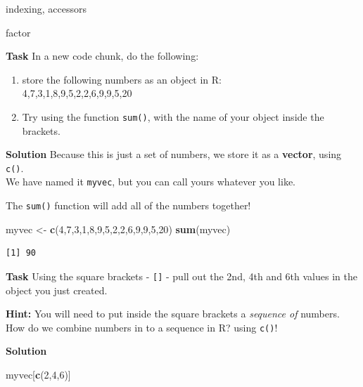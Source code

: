 \documentclass[]{book}
\newenvironment{Shaded}{\begin{snugshade}}{\end{snugshade}}
\newcommand{\DecValTok}[1]{\textcolor[rgb]{0.00,0.00,0.81}{#1}}
\newcommand{\KeywordTok}[1]{\textcolor[rgb]{0.13,0.29,0.53}{\textbf{#1}}}
\newcommand{\NormalTok}[1]{#1}
\newcommand{\StringTok}[1]{\textcolor[rgb]{0.31,0.60,0.02}{#1}}
\providecommand{\tightlist}{%
  \setlength{\itemsep}{0pt}\setlength{\parskip}{0pt}}
\begin{document}
indexing, accessors

factor

\textbf{Task}
In a new code chunk, do the following:

\begin{enumerate}
\def\labelenumi{\arabic{enumi}.}
\tightlist
\item
  store the following numbers as an object in R:\\
  4,7,3,1,8,9,5,2,2,6,9,9,5,20\\
\item
  Try using the function \texttt{sum()}, with the name of your object inside the brackets.
\end{enumerate}

\textbf{Solution }
Because this is just a set of numbers, we store it as a \textbf{vector}, using \texttt{c()}.\\
We have named it \texttt{myvec}, but you can call yours whatever you like.

The \texttt{sum()} function will add all of the numbers together!

\begin{Shaded}
\begin{Highlighting}[]
\NormalTok{myvec <-}\StringTok{ }\KeywordTok{c}\NormalTok{(}\DecValTok{4}\NormalTok{,}\DecValTok{7}\NormalTok{,}\DecValTok{3}\NormalTok{,}\DecValTok{1}\NormalTok{,}\DecValTok{8}\NormalTok{,}\DecValTok{9}\NormalTok{,}\DecValTok{5}\NormalTok{,}\DecValTok{2}\NormalTok{,}\DecValTok{2}\NormalTok{,}\DecValTok{6}\NormalTok{,}\DecValTok{9}\NormalTok{,}\DecValTok{9}\NormalTok{,}\DecValTok{5}\NormalTok{,}\DecValTok{20}\NormalTok{)}
\KeywordTok{sum}\NormalTok{(myvec)}
\end{Highlighting}
\end{Shaded}

\begin{verbatim}
[1] 90
\end{verbatim}

\textbf{Task}
Using the square brackets - \texttt{{[}{]}} - pull out the 2nd, 4th and 6th values in the object you just created.

\textbf{Hint:} You will need to put inside the square brackets a \emph{sequence of} numbers. How do we combine numbers in to a sequence in R? using \texttt{c()}!

\textbf{Solution }

\begin{Shaded}
\begin{Highlighting}[]
\NormalTok{myvec[}\KeywordTok{c}\NormalTok{(}\DecValTok{2}\NormalTok{,}\DecValTok{4}\NormalTok{,}\DecValTok{6}\NormalTok{)]}
\end{Highlighting}
\end{Shaded}
\end{document}
